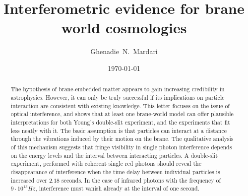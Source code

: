 \documentclass[a4paper,aps,prl,twocolumn,showpacs]{revtex4}
\begin{document}
\title{Interferometric evidence for brane world cosmologies}

\author{Ghenadie~N.~Mardari}


\date{\today}

\begin{abstract}
The hypothesis of brane-embedded matter appears to gain increasing
credibility in astrophysics. However, it can only be truly
successful if its implications on particle interaction are
consistent with existing knowledge. This letter focuses on the
issue of optical interference, and shows that at least one
brane-world model can offer plausible interpretations for both
Young's double-slit experiment, and the experiments that fit less
neatly with it. The basic assumption is that particles can
interact at a distance through the vibrations induced by their
motion on the brane. The qualitative analysis of this mechanism
suggests that fringe visibility in single photon interference
depends on the energy levels and the interval between interacting
particles. A double-slit experiment, performed with coherent
single red photons should reveal the disappearance of interference
when the time delay between individual particles is increased over
$2.18$ seconds. In the case of infrared photons with the frequency
of $9\cdot 10^{13} Hz$, interference must vanish already at the
interval of one second.
\end{abstract}


\maketitle
\end{document}
